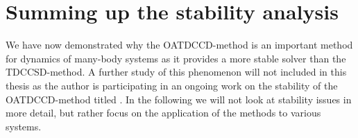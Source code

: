     \section{Summing up the stability analysis}
        We have now demonstrated why the OATDCCD-method is an important method
        for dynamics of many-body systems as it provides a more stable solver
        than the TDCCSD-method.
        A further study of this phenomenon will not included in this thesis as
        the author is participating in an ongoing work on the stability of the
        OATDCCD-method titled  \cite{oa-stability}.
        In the following we will not look at stability issues in more detail,
        but rather focus on the application of the methods to various systems.




\clearpage
